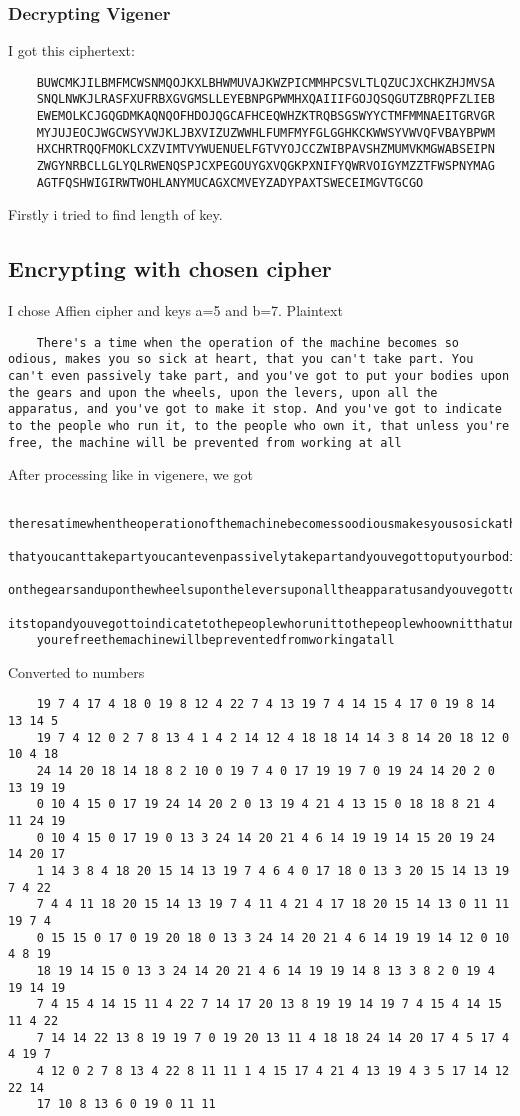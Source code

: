 \documentclass[10pt]{article}
\begin{document}
\subsubsection{Decrypting Vigener}
I got this ciphertext:
	\begin{verbatim}
	BUWCMKJILBMFMCWSNMQOJKXLBHWMUVAJKWZPICMMHPCSVLTLQZUCJXCHKZHJMVSA
	SNQLNWKJLRASFXUFRBXGVGMSLLEYEBNPGPWMHXQAIIIFGOJQSQGUTZBRQPFZLIEB
	EWEMOLKCJGQGDMKAQNQOFHDOJQGCAFHCEQWHZKTRQBSGSWYYCTMFMMNAEITGRVGR
	MYJUJEOCJWGCWSYVWJKLJBXVIZUZWWHLFUMFMYFGLGGHKCKWWSYVWVQFVBAYBPWM
	HXCHRTRQQFMOKLCXZVIMTVYWUENUELFGTVYOJCCZWIBPAVSHZMUMVKMGWABSEIPN
	ZWGYNRBCLLGLYQLRWENQSPJCXPEGOUYGXVQGKPXNIFYQWRVOIGYMZZTFWSPNYMAG
	AGTFQSHWIGIRWTWOHLANYMUCAGXCMVEYZADYPAXTSWECEIMGVTGCGO
	\end{verbatim}
Firstly i tried to find length of key.




\subsection{Encrypting with chosen cipher}
I chose Affien cipher and keys a=5 and b=7.
Plaintext
\begin{verbatim}
	There's a time when the operation of the machine becomes so odious, makes you so sick at heart, that you can't take part. You can't even passively take part, and you've got to put your bodies upon the gears and upon the wheels, upon the levers, upon all the apparatus, and you've got to make it stop. And you've got to indicate to the people who run it, to the people who own it, that unless you're free, the machine will be prevented from working at all
\end{verbatim}
After processing like in vigenere, we got
\begin{verbatim}
	theresatimewhentheoperationofthemachinebecomessoodiousmakesyousosickatheart
	thatyoucanttakepartyoucantevenpassivelytakepartandyouvegottoputyourbodiesup
	onthegearsanduponthewheelsupontheleversuponalltheapparatusandyouvegottomake
	itstopandyouvegottoindicatetothepeoplewhorunittothepeoplewhoownitthatunless
	yourefreethemachinewillbepreventedfromworkingatall
\end{verbatim}

Converted to numbers
\begin{verbatim}
	19 7 4 17 4 18 0 19 8 12 4 22 7 4 13 19 7 4 14 15 4 17 0 19 8 14 13 14 5 
	19 7 4 12 0 2 7 8 13 4 1 4 2 14 12 4 18 18 14 14 3 8 14 20 18 12 0 10 4 18 
	24 14 20 18 14 18 8 2 10 0 19 7 4 0 17 19 19 7 0 19 24 14 20 2 0 13 19 19 
	0 10 4 15 0 17 19 24 14 20 2 0 13 19 4 21 4 13 15 0 18 18 8 21 4 11 24 19 
	0 10 4 15 0 17 19 0 13 3 24 14 20 21 4 6 14 19 19 14 15 20 19 24 14 20 17 
	1 14 3 8 4 18 20 15 14 13 19 7 4 6 4 0 17 18 0 13 3 20 15 14 13 19 7 4 22 
	7 4 4 11 18 20 15 14 13 19 7 4 11 4 21 4 17 18 20 15 14 13 0 11 11 19 7 4 
	0 15 15 0 17 0 19 20 18 0 13 3 24 14 20 21 4 6 14 19 19 14 12 0 10 4 8 19 
	18 19 14 15 0 13 3 24 14 20 21 4 6 14 19 19 14 8 13 3 8 2 0 19 4 19 14 19 
	7 4 15 4 14 15 11 4 22 7 14 17 20 13 8 19 19 14 19 7 4 15 4 14 15 11 4 22 
	7 14 14 22 13 8 19 19 7 0 19 20 13 11 4 18 18 24 14 20 17 4 5 17 4 4 19 7 
	4 12 0 2 7 8 13 4 22 8 11 11 1 4 15 17 4 21 4 13 19 4 3 5 17 14 12 22 14 
	17 10 8 13 6 0 19 0 11 11
\end{verbatim}
\end{document}
